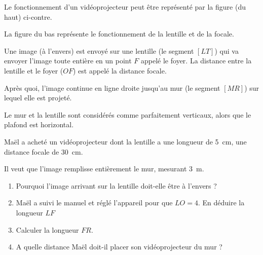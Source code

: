 
\begin{minipage}[t]{0.60\textwidth}
    Le fonctionnement d'un vidéoprojecteur peut être représenté par la figure (du haut) ci-contre.

    La figure du bas représente le fonctionnement de la lentille et de la focale.

    Une image (à l'envers) est envoyé sur une lentille (le segment $[LT]$) qui va envoyer l'image toute entière en un point $F$ appelé le foyer. La distance entre la lentille et le foyer ($OF$) est appelé la distance focale.

    Après quoi, l'image continue en ligne droite jusqu'au mur (le segment $[MR]$) sur lequel elle est projeté.

    Le mur et la lentille sont considérés comme parfaitement verticaux, alors que le plafond est horizontal. 

    Maël a acheté un vidéoprojecteur dont la lentille a une longueur de 5~cm, une distance focale de 30~cm.

    Il veut que l'image remplisse entièrement le mur, mesurant 3~m. 

    \begin{enumerate}
        \item Pourquoi l'image arrivant sur la lentille doit-elle être à l'envers ?
        \item Maël a suivi le manuel et réglé l'appareil pour que $LO=4$. En déduire la longueur $LF$
        \item Calculer la longueur $FR$.
        \item A quelle distance Maël doit-il placer son vidéoprojecteur du mur ?
    \end{enumerate}


    
\end{minipage}
\hfill
